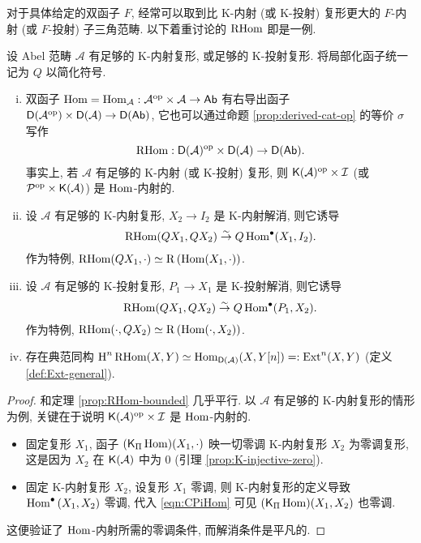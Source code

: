 对于具体给定的双函子 $F$, 经常可以取到比 K-内射 (或 K-投射) 复形更大的 $F$-内射 (或 $F$-投射) 子三角范畴. 以下着重讨论的 $\RHom$ 即是一例.

\begin{theorem}[无界 $\RHom$]\label{prop:unbounded-RHom}
	设 Abel 范畴 $\mathcal{A}$ 有足够的 K-内射复形, 或足够的 K-投射复形. 将局部化函子统一记为 $Q$ 以简化符号.
	\begin{enumerate}[(i)]
		\item 双函子 $\operatorname{Hom} = \operatorname{Hom}_{\mathcal{A}}: \mathcal{A}^{\operatorname{op}} \times \mathcal{A} \to \mathsf{Ab}$ 有右导出函子 $\mathsf{D}(\mathcal{A}^{\operatorname{op}}) \times \mathsf{D}(\mathcal{A}) \to \mathsf{D}(\mathsf{Ab})$, 它也可以通过命题 \ref{prop:derived-cat-op} 的等价 $\sigma$ 写作
		\[ \operatorname{RHom}: \mathsf{D}(\mathcal{A})^{\operatorname{op}} \times \mathsf{D}(\mathcal{A}) \to \mathsf{D}(\mathsf{Ab}). \]
		事实上, 若 $\mathcal{A}$ 有足够的 K-内射 (或 K-投射) 复形, 则 $\mathsf{K}(\mathcal{A})^{\operatorname{op}} \times \mathcal{I}$ (或 $\mathcal{P}^{\operatorname{op}} \times \mathsf{K}(\mathcal{A})$) 是 $\operatorname{Hom}$-内射的.
		\item 设 $\mathcal{A}$ 有足够的 K-内射复形, $X_2 \to I_2$ 是 K-内射解消, 则它诱导
		\[ \operatorname{RHom}(Q X_1, Q X_2) \stackrel{\sim}{\rightarrow} Q \operatorname{Hom}^\bullet(X_1, I_2). \]
		作为特例, $\operatorname{RHom}(Q X_1, \cdot) \simeq \mathrm{R}\left( \operatorname{Hom}(X_1, \cdot) \right)$.
		\item 设 $\mathcal{A}$ 有足够的 K-投射复形, $P_1 \to X_1$ 是 K-投射解消, 则它诱导
		\[ \operatorname{RHom}(Q X_1, Q X_2) \stackrel{\sim}{\rightarrow} Q \operatorname{Hom}^\bullet(P_1, X_2). \]
		作为特例, $\operatorname{RHom}(\cdot, Q X_2) \simeq \mathrm{R}\left(\operatorname{Hom}(\cdot, X_2)\right)$.
		\item 存在典范同构 $\operatorname{H}^n \operatorname{RHom}(X, Y) \simeq \operatorname{Hom}_{\mathsf{D}(\mathcal{A})}(X, Y[n]) =: \operatorname{Ext}^n(X, Y)$ (定义 \ref{def:Ext-general}).
	\end{enumerate}
\end{theorem}
\begin{proof}
	和定理 \ref{prop:RHom-bounded} 几乎平行. 以 $\mathcal{A}$ 有足够的 K-内射复形的情形为例, 关键在于说明 $\mathsf{K}(\mathcal{A})^{\operatorname{op}} \times \mathcal{I}$ 是 $\operatorname{Hom}$-内射的.
	\begin{itemize}
		\item 固定复形 $X_1$, 函子 $(\mathsf{K}_\Pi \operatorname{Hom})(X_1, \cdot)$ 映一切零调 K-内射复形 $X_2$ 为零调复形, 这是因为 $X_2$ 在 $\mathsf{K}(\mathcal{A})$ 中为 $0$ (引理 \ref{prop:K-injective-zero}).
		\item 固定 K-内射复形 $X_2$, 设复形 $X_1$ 零调, 则 K-内射复形的定义导致 $\operatorname{Hom}^\bullet\left( X_1, X_2 \right)$ 零调, 代入 \eqref{eqn:CPiHom} 可见 $(\mathsf{K}_\Pi \operatorname{Hom})(X_1, X_2)$ 也零调.
	\end{itemize}
	这便验证了 $\operatorname{Hom}$-内射所需的零调条件, 而解消条件是平凡的.
\end{proof}

